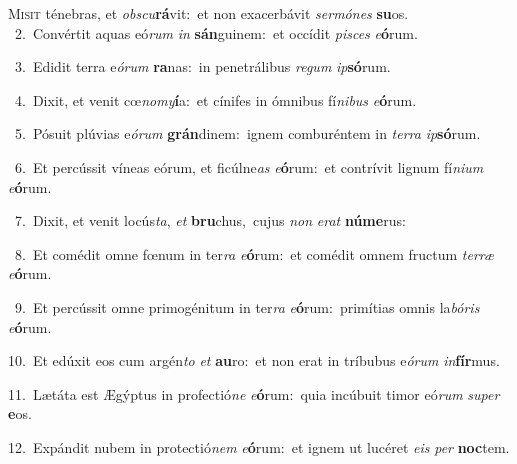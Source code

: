 \lettrine{\initial\textcolor{\initialcolor}{M}}{isit} ténebras, et \textit{obs}\-\textit{cu}\textbf{rá}vit:~\star et non exacerbávit \textit{ser}\-\textit{mó}\textit{nes} \textbf{su}\-os.\\
{\numbfont\textcolor{\numbcolor}{~2.}}~Convértit aquas eó\textit{rum} \textit{in} \textbf{sán}\-guinem:~\star et occídit \textit{pi}\-\textit{sces} \textit{e}\-\textbf{ó}rum.\par
{\numbfont\textcolor{\numbcolor}{~3.}}~Edidit terra e\-\textit{ó}\-\textit{rum} \textbf{ra}\-nas:~\star in penetrálibus \textit{re}\-\textit{gum} \textit{ip}\-\textbf{só}rum.\par
{\numbfont\textcolor{\numbcolor}{~4.}}~Dixit, et venit cœ\-\textit{no}\-\textit{my}\textbf{í}a:~\star et cínifes in ómnibus fí\-\textit{ni}\-\textit{bus} \textit{e}\-\textbf{ó}rum.\par
{\numbfont\textcolor{\numbcolor}{~5.}}~Pósuit plúvias e\-\textit{ó}\-\textit{rum} \textbf{grán}\-dinem:~\star ignem comburéntem in \textit{ter}\-\textit{ra} \textit{ip}\-\textbf{só}rum.\par
{\numbfont\textcolor{\numbcolor}{~6.}}~Et percússit víneas eórum, et ficúlne\textit{as} \textit{e}\-\textbf{ó}rum:~\star et contrívit lignum fí\-\textit{ni}\-\textit{um} \textit{e}\-\textbf{ó}rum.\par
{\numbfont\textcolor{\numbcolor}{~7.}}~Dixit, et venit locús\-\textit{ta}\-, \textit{et} \textbf{bru}\-chus,~\star cujus \textit{non} \textit{e}\-\textit{rat} \textbf{nú}\-\textbf{me}rus:\par
{\numbfont\textcolor{\numbcolor}{~8.}}~Et comédit omne fœnum in ter\textit{ra} \textit{e}\-\textbf{ó}rum:~\star et comédit omnem fructum \textit{ter}\-\textit{ræ} \textit{e}\-\textbf{ó}rum.\par
{\numbfont\textcolor{\numbcolor}{~9.}}~Et percússit omne primogénitum in ter\textit{ra} \textit{e}\-\textbf{ó}rum:~\star primítias omnis la\-\textit{bó}\-\textit{ris} \textit{e}\-\textbf{ó}rum.\par
{\numbfont\textcolor{\numbcolor}{10.}}~Et edúxit eos cum argén\textit{to} \textit{et} \textbf{au}\-ro:~\star et non erat in tríbubus e\-\textit{ó}\-\textit{rum} \textit{in}\-\textbf{fír}mus.\par
{\numbfont\textcolor{\numbcolor}{11.}}~Lætáta est Ægýptus in profectió\textit{ne} \textit{e}\-\textbf{ó}rum:~\star quia incúbuit timor eó\textit{rum} \textit{su}\-\textit{per} \textbf{e}\-os.\par
{\numbfont\textcolor{\numbcolor}{12.}}~Expándit nubem in protectió\textit{nem} \textit{e}\-\textbf{ó}rum:~\star et ignem ut lucéret \textit{e}\-\textit{is} \textit{per} \textbf{noc}\-tem.\par
